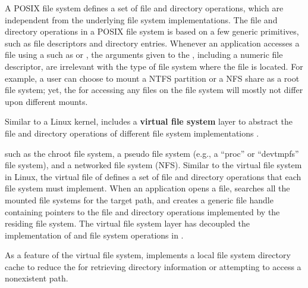 A POSIX file system defines a set of file and directory operations,
which are independent from
the underlying file system implementations.
The file and directory operations in a POSIX file system
is based on a few generic primitives,
such as file descriptors and directory entries.
Whenever an application accesses a file using a \linuxapi{} such as  or ,
the arguments given to the \linuxapi{}, including a numeric file descriptor, are irrelevant with the type of file system
where the file is located.
For example, a user can choose to mount a NTFS partition
or a NFS share as a root file system;
yet, the \linuxapis{} for accessing any files on the file system
will mostly not differ upon different mounts.



Similar to a Linux kernel, \thelibos{} includes a {\bf virtual file system} layer
to abstract the file and directory operations of different file system implementations .



such as the chroot file system, a pseudo file system (e.g., a ``proc'' or ``devtmpfs'' file system), and a networked file system (NFS).
Similar to the virtual file system in Linux,
the virtual file of \thelibos{} defines a set of file and directory operations that
each file system must implement.
When an application opens a file,
\thelibos{} searches all the mounted file systems for the target path,
and creates a generic file handle containing pointers
to the file and directory operations implemented by the residing file system.
The virtual file system layer has decoupled
the implementation of \linuxapis{} and file system operations in \thelibos{}.







As a feature of the virtual file system, \thelibos{} implements
a local file system directory cache
to reduce the \hostapis{} for retrieving directory information
or attempting to access a nonexistent path.











